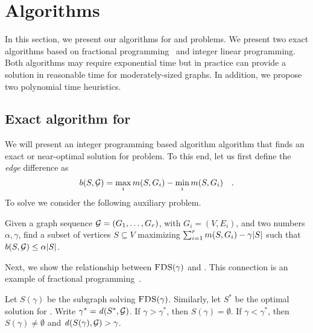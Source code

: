 \section{Algorithms}\label{sec:algorithm}

In this section, we present our algorithms for \problemcdcsm and \problemcdcsdiff problems. We present two exact algorithms based on fractional programming~\citep{dinkelbach1967nonlinear} and integer linear programming. Both algorithms may require exponential time but in practice can provide a solution in reasonable time for moderately-sized graphs. In addition, we propose two polynomial time heuristics.

\subsection{Exact algorithm for \problemcdcsm}

We will present an integer programming based algorithm algorithm that finds an exact or near-optimal solution for \problemcdcsm problem. 
To this end, let us first define the \emph{edge} difference as
\[
    b(S, {\mathcal G}) = \max_i m(S, G_i) - \min_i m(S, G_i)\quad.
\]
To solve \problemcdcsm we consider the following auxiliary problem.

\begin{problem}[$\problemcdcsm(\gamma)$]
\label{pr:label-subgrap-str-wk-alpha}
Given a graph sequence ${\mathcal G} = (G_1,\dots,G_r)$, with  $G_i = (V, E_i)$, and two numbers $\alpha, \gamma$, find a subset of vertices $S \subseteq V$ maximizing  $ \sum_{i = 1}^r m(S, G_i) - \gamma {\left|S\right|}$ such that $b(S, {\mathcal G}) \leq  \alpha {\left|S\right|}$.
\end{problem}

Next, we show the relationship between $\problemcdcsm(\gamma)$ and \problemcdcsm. This connection is an example of fractional programming~\citep{dinkelbach1967nonlinear}.


\begin{proposition}
\label{prop:frac}
Let $S(\gamma)$  be the subgraph  solving $\problemcdcsm(\gamma)$. Similarly, let $S^*$  be the optimal solution for \problemcdcsm. Write $\gamma^* =  \dens{S^*, \calG}$. If $\gamma > \gamma^*$, then $S(\gamma) = \emptyset$. If $\gamma < \gamma^*$, then $S(\gamma) \neq \emptyset$ and $\dens{S(\gamma),  \calG} > \gamma$.
\end{proposition}


